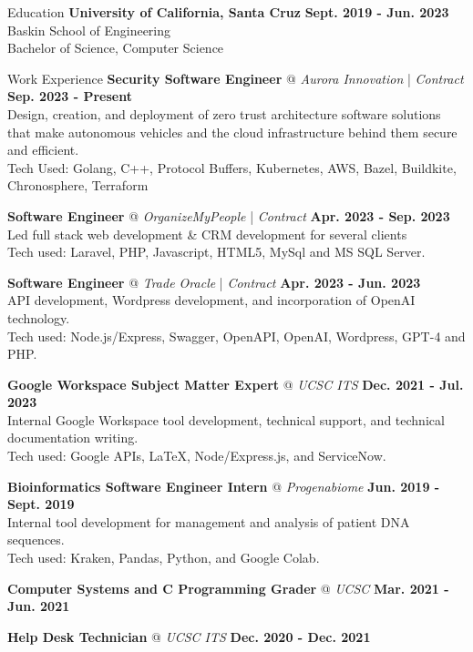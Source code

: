 \documentclass{resume} %
\begin{document}
\begin{rSection}{Education}
    \textbf{University of California, Santa Cruz}
    \hfill{\textbf {Sept. 2019 - Jun. 2023}}
    \\ Baskin School of Engineering
    \\ Bachelor of Science, Computer Science
\end{rSection}

\begin{rSection}{Work Experience}
    {\textbf{Security Software Engineer}} @ \textit{{Aurora Innovation}} | \textit {Contract}
    \hfill{\textbf {Sep. 2023 - Present}}
    \\ Design, creation, and deployment of zero trust architecture software solutions that make autonomous vehicles and the cloud infrastructure behind them secure and efficient.
    \\ Tech Used: Golang, C++, Protocol Buffers, Kubernetes, AWS, Bazel, Buildkite, Chronosphere, Terraform

    {\textbf{Software Engineer} @ \textit{OrganizeMyPeople}} | \textit {Contract}
    \hfill{\textbf {Apr. 2023 - Sep. 2023}}
    \\ Led full stack web development \& CRM development for several clients
    \\ Tech used: Laravel, PHP, Javascript, HTML5, MySql and MS SQL Server.

    \textbf{Software Engineer} @  \textit{Trade Oracle} | \textit {Contract}
    \hfill{\textbf {Apr. 2023 - Jun. 2023}}
    \\ API development, Wordpress development, and incorporation of OpenAI technology.
    \\ Tech used: Node.js/Express, Swagger, OpenAPI, OpenAI, Wordpress, GPT-4 and PHP. 

    {\textbf{Google Workspace Subject Matter Expert} @ \textit{UCSC ITS} }
    \hfill{\textbf {Dec. 2021 - Jul. 2023}}
    \\ Internal Google Workspace tool development, technical support, and technical documentation writing.
    \\ Tech used: Google APIs, LaTeX, Node/Express.js, and ServiceNow.

    {\textbf{Bioinformatics Software Engineer Intern} @ \textit{Progenabiome}}
    \hfill{\textbf {Jun. 2019 - Sept. 2019}}
    \\ Internal tool development for management and analysis of patient DNA sequences.
    \\ Tech used: Kraken, Pandas, Python, and Google Colab.

    {\textbf{Computer Systems and C Programming Grader} @ \textit{UCSC} }
    \hfill{\textbf {Mar. 2021 - Jun. 2021}}

    {\textbf{Help Desk Technician} @ \textit{UCSC ITS}}
    \hfill{\textbf {Dec. 2020 - Dec. 2021}}
\end{rSection}
\end{document}
